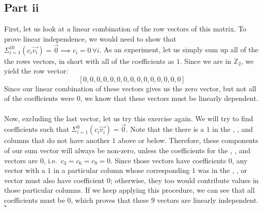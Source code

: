 \documentclass[letterpaper]{article}
\newcommand*{\QED}{\hfill\ensuremath{\square}}%
\begin{document}
\subsection{Part ii}
\label{sub:5Partii}

First, let us look at a linear combination of the row vectors of this matrix.
To prove linear independence, we would need to show that $ \Sigma_{i = 1}^{10} (c_i \vec{v_i}) = \vec{0} \implies c_i = 0 \, \forall i $.
As an experiment, let us simply sum up all of the the rows vectors, in short with all of the coefficients as $ 1 $.
Since we are in $ \mathbb{Z}_2 $, we yield the row vector:
$$ [0, 0, 0, 0, 0, 0, 0, 0, 0, 0, 0, 0, 0, 0, 0] $$
Since our linear combination of these vectors gives us the zero vector, but not all of the coefficients were $ 0 $, we know that these vectors must be linearly dependent.
\\ \\
Now, excluding the last vector, let us try this exercise again.
We will try to find coefficients such that $ \Sigma_{i = 1}^{9} (c_i \vec{v_i}) = \vec{0} $.
Note that the there is a $ 1 $ in the , , and  columns that do not have another $ 1 $ above or below.
Therefore, these components of our sum vector will always be non-zero, unless the coefficients for the , , and  vectors are $ 0 $, i.e.\ $ c_3 = c_6 = c_9 = 0 $.
Since those vectors have coefficients $ 0 $, any vector with a $ 1 $ in a particular column whose corresponding $ 1 $ was in the , , or  vector must also have coefficient $ 0 $; otherwise, they too would contribute values in those particular columns.
If we keep applying this procedure, we can see that all coefficients must be $ 0 $, which proves that these $ 9 $ vectors are linearly independent.
\QED{}
\end{document}
